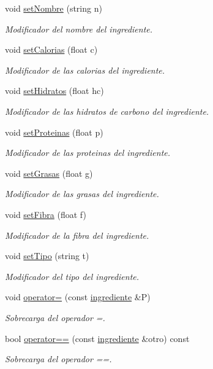 \begin{DoxyCompactItemize}
void \hyperlink{classingrediente_aac5aba3c36aa762c72a8bc38271e4c12}{set\+Nombre} (string n)
\begin{DoxyCompactList}\small\item\em Modificador del nombre del ingrediente. \end{DoxyCompactList}\item 
void \hyperlink{classingrediente_af2f59af7fe9bf623fc6e9fa4e6da5fac}{set\+Calorias} (float c)
\begin{DoxyCompactList}\small\item\em Modificador de las calorias del ingrediente. \end{DoxyCompactList}\item 
void \hyperlink{classingrediente_ab678b69e2374ae25439162e4288d1e8a}{set\+Hidratos} (float hc)
\begin{DoxyCompactList}\small\item\em Modificador de las hidratos de carbono del ingrediente. \end{DoxyCompactList}\item 
void \hyperlink{classingrediente_a5ee4fac5c35f8ff71e7f974d1675a626}{set\+Proteinas} (float p)
\begin{DoxyCompactList}\small\item\em Modificador de las proteinas del ingrediente. \end{DoxyCompactList}\item 
void \hyperlink{classingrediente_a5b20e7a788dcdb5685c66c7362d65533}{set\+Grasas} (float g)
\begin{DoxyCompactList}\small\item\em Modificador de las grasas del ingrediente. \end{DoxyCompactList}\item 
void \hyperlink{classingrediente_a13928358db435d4a42b348f6ea1ee548}{set\+Fibra} (float f)
\begin{DoxyCompactList}\small\item\em Modificador de la fibra del ingrediente. \end{DoxyCompactList}\item 
void \hyperlink{classingrediente_ae51c71ad615844974ee24bb2fe9c7b80}{set\+Tipo} (string t)
\begin{DoxyCompactList}\small\item\em Modificador del tipo del ingrediente. \end{DoxyCompactList}\item 
void \hyperlink{classingrediente_a0556714d34bdd366599fc02758b6d046}{operator=} (const \hyperlink{classingrediente}{ingrediente} \&P)
\begin{DoxyCompactList}\small\item\em Sobrecarga del operador =. \end{DoxyCompactList}\item 
bool \hyperlink{classingrediente_aa3bc521369e0ba37383ca0958697f5af}{operator==} (const \hyperlink{classingrediente}{ingrediente} \&otro) const
\begin{DoxyCompactList}\small\item\em Sobrecarga del operador ==. \end{DoxyCompactList}\end{DoxyCompactItemize}
